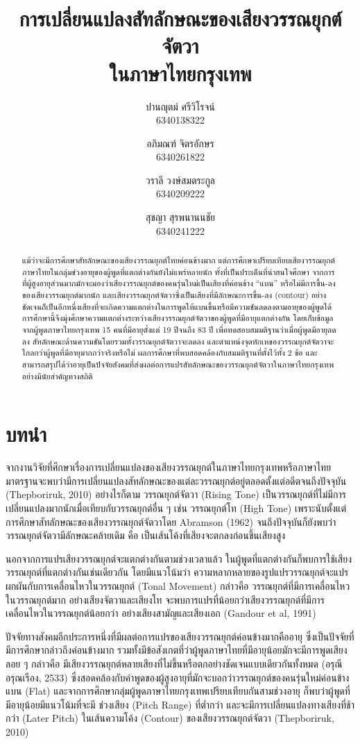 \documentclass[a4paper]{article}
\title{การเปลี่ยนแปลงสัทลักษณะของเสียงวรรณยุกต์จัตวา\\ในภาษาไทยกรุงเทพ}
\author{
    ปานญุตม์ ศรีวิโรจน์\\6340138322
    \and
    อภิมณฑ์ จิตรอักษร\\6340261822
    \and
    วราลี วงษ์สมตระกูล\\6340209222
    \and
    สุชญา สุรพนานนชัย\\6340241222
}
\date{}
\begin{document}
\maketitle
\begin{abstract}
    แม้ว่าจะมีการศึกษาสัทลักษณะของเสียงวรรณยุกต์ไทยค่อนข้างมาก แต่การศึกษาเปรียบเทียบเสียงวรรณยุกต์ภาษาไทยในกลุ่มช่วงอายุของผู้พูดที่แตกต่างกันยังไม่แพร่หลายนัก ทั้งที่เป็นประเด็นที่น่าสนใจศึกษา จากการที่ผู้สูงอายุส่วนมากมักจะมองว่าเสียงวรรณยุกต์ของคนรุ่นใหม่เป็นเสียงที่ค่อนข้าง “แบน” หรือไม่มีการขึ้น-ลงของเสียงวรรณยุกต์มากนัก  และเสียงวรรณยุกต์จัตวาซึ่งเป็นเสียงที่มีลักษณะการขึ้น-ลง (contour) อย่างชัดเจนก็เป็นอีกหนึ่งเสียงที่จะเกิดความแตกต่างในการพูดให้แบนขึ้นหรือมีความชันลดลงตามอายุของผู้พูดได้ การศึกษานี้จึงมุ่งศึกษาความแตกต่างระหว่างเสียงวรรณยุกต์จัตวาของผู้พูดที่มีอายุแตกต่างกัน โดยเก็บข้อมูลจากผู้พูดภาษาไทยกรุงเทพ 15 คนที่มีอายุตั้งแต่ 19 ปีจนถึง 83 ปี เพื่อทดสอบสมมติฐานว่าเมื่อผู้พูดมีอายุลดลง สัทลักษณะด้านความชันโดยรวมทั้งวรรณยุกต์จัตวาจะลดลง และตำแหน่งจุดหักเหของวรรณยุกต์จัตวาจะไกลกว่าผู้พูดที่มีอายุมากกว่าจริงหรือไม่ ผลการศึกษาที่พบสอดคล้องกับสมมติฐานที่ตั้งไว้ทั้ง 2 ข้อ และสามารถสรุปได้ว่าอายุเป็นปัจจัยสังคมที่ส่งผลต่อการแปรสัทลักษณะของวรรณยุกต์จัตวาในภาษาไทยกรุงเทพอย่างมีนัยสำคัญทางสถิติ
\end{abstract}
\section{บทนำ}
    จากงานวิจัยที่ศึกษาเรื่องการเปลี่ยนแปลงของเสียงวรรณยุกต์ในภาษาไทยกรุงเทพหรือภาษาไทยมาตรฐานจะพบว่ามีการเปลี่ยนแปลงสัทลักษณะของแต่ละวรรณยุกต์อยู่ตลอดตั้งแต่อดีตจนถึงปัจจุบัน (Thepboriruk, 2010) อย่างไรก็ตาม วรรณยุกต์จัตวา (Rising Tone) เป็นวรรณยุกต์ที่ไม่มีการเปลี่ยนแปลงมากนักเมื่อเทียบกับวรรณยุกต์อื่น ๆ เช่น วรรณยุกต์โท (High Tone) เพราะนับตั้งแต่การศึกษาสัทลักษณะของเสียงวรรณยุกต์จัตวาโดย Abramson (1962) จนถึงปัจจุบันก็ยังพบว่าวรรณยุกต์จัตวามีลักษณะคล้ายเดิม คือ เป็นเส้นโค้งที่เสียงจะตกลงก่อนขึ้นเสียงสูง

    นอกจากการแปรเสียงวรรณยุกต์จะแตกต่างกันตามช่วงเวลาแล้ว ในผู้พูดที่แตกต่างกันก็พบการใช้เสียงวรรณยุกต์ที่แตกต่างกันเช่นเดียวกัน โดยมีแนวโน้มว่า ความหลากหลายของรูปแปรวรรณยุกต์จะแปรผกผันกับการเคลื่อนไหวในวรรณยุกต์ (Tonal Movement) กล่าวคือ วรรณยุกต์ที่มีการเคลื่อนไหวในวรรณยุกต์มาก อย่างเสียงจัตวาและเสียงโท จะพบการแปรที่น้อยกว่าเสียงวรรณยุกต์ที่มีการเคลื่อนไหวในวรรณยุกต์น้อยกว่า อย่างเสียงสามัญและเสียงเอก (Gandour et al, 1991)

    ปัจจัยทางสังคมอีกประการหนึ่งที่มีผลต่อการแปรของเสียงวรรณยุกต์ค่อนข้างมากคืออายุ ซึ่งเป็นปัจจัยที่มีการศึกษากล่าวถึงค่อนข้างมาก รวมทั้งมีข้อสังเกตที่ว่าผู้พูดภาษาไทยที่มีอายุน้อยมักจะมีการพูดเสียงลอย ๆ กล่าวคือ มีเสียงวรรณยุกต์หลายเสียงที่ไม่ขึ้นหรือตกอย่างชัดเจนแบบเดียวกันทั้งหมด (อรุณี อรุณเรือง, 2533) ซึ่งสอดคล้องกับคำพูดของผู้สูงอายุที่มักจะบอกว่าวรรณยุกต์ของคนรุ่นใหม่ค่อนข้างแบน (Flat) และจากการศึกษากลุ่มผู้พูดภาษาไทยกรุงเทพเปรียบเทียบกันสามช่วงอายุ ก็พบว่าผู้พูดที่มีอายุน้อยมีแนวโน้มที่จะมี ช่วงเสียง (Pitch Range) ที่ต่ำกว่า และจะมีการเปลี่ยนแปลงทางเสียงที่ช้ากว่า (Later Pitch) ในเส้นความโค้ง (Contour) ของเสียงวรรณยุกต์จัตวา (Thepboriruk, 2010)
\end{document}
